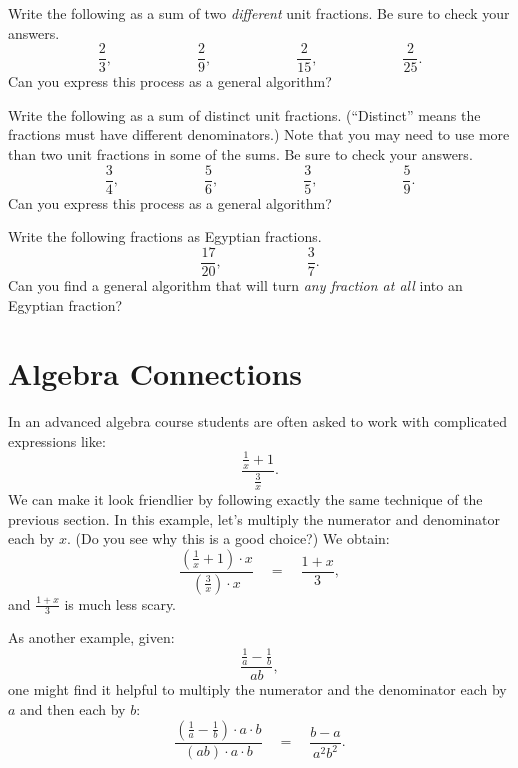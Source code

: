 \begin{problem}[$\frac 2 n$]
Write the following as a sum of two \emph{different} unit fractions.  Be sure to check your answers.
\[
\frac 2 3,
\qquad\qquad\qquad
\frac 2 9,
\qquad\qquad\qquad
\frac 2 {15},
\qquad\qquad\qquad
\frac 2{25}.
\]
Can you express this process as a general algorithm?


\end{problem}


\begin{problem}
Write the following as a sum of distinct unit fractions.  (``Distinct'' means the fractions must have different  denominators.)  Note that you may need to use more than two unit fractions in some of the sums.  Be sure to check your answers.
\[
\frac 3 4,
\qquad\qquad\qquad
\frac 5 6,
\qquad\qquad\qquad
\frac 3 5,
\qquad\qquad\qquad
\frac 5 9.
\]
Can you express this process as a general algorithm?


\end{problem}






\begin{problem}[Challenges]
Write the following fractions as Egyptian fractions.  
\[
\frac{17}{20},
\qquad\qquad\qquad
\frac 3 7.
\]
Can you find a general algorithm that will turn \emph{any fraction at all} into an Egyptian fraction?


\end{problem}






\section{Algebra Connections}
In an advanced algebra course students are often asked to work with complicated
expressions like:
\[
\frac{\frac 1 x + 1}{\frac 3 x}.
\]
We can make it look friendlier by following exactly the same technique of the
previous section. In this example, let's multiply the numerator and denominator each
by $x$. (Do you see why this is a good choice?) We obtain:
\[
\frac{\left(\frac 1 x + 1\right)\cdot x}{\left(\frac 3 x\right)\cdot x}
\quad
=
\quad
\frac{1+x}{3},
\]
and $\frac{1+x}{3}$ is much less scary.

\begin{example}
As another example, given:
\[
\frac{\frac 1 a - \frac 1 b}{ab},
\]
one might find it helpful to multiply the numerator and the denominator each
by $a$ and then each by $b$:
\[
\frac{\left(\frac 1 a - \frac 1 b\right)\cdot a \cdot b}{\left(ab\right)\cdot a \cdot b}
\quad
=
\quad
\frac{b-a}{a^2b^2}.
\]

\end{example}


